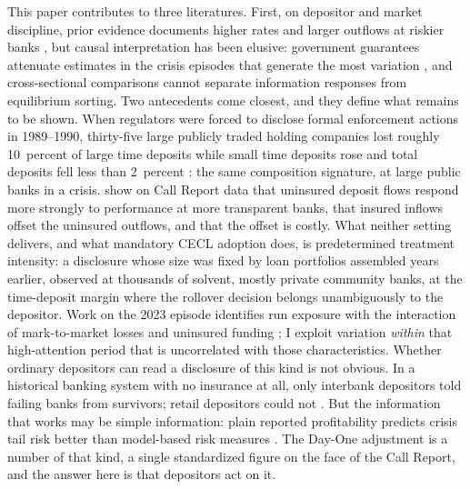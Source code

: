 This paper contributes to three literatures.  First, on depositor and
market discipline, prior evidence documents higher rates and larger
outflows at riskier banks \citep{park1995market, park1998market,
egan2017deposit},
but causal interpretation has
been elusive: government guarantees attenuate estimates in the crisis
episodes that generate the most variation \citep{berger2015depositors,
jacewitz2018deposit}, and cross-sectional
comparisons cannot separate information responses from equilibrium
sorting.  Two antecedents come closest, and they define what remains
to be shown.  When regulators were forced to disclose formal
enforcement actions in 1989--1990, thirty-five large publicly traded
holding companies lost roughly 10~percent of large time deposits while
small time deposits rose and total deposits fell less than 2~percent
\citep{jordan2000market}: the same composition signature, at large
public banks in a crisis.  \citet{chen2022bank} show on Call Report
data that uninsured deposit flows respond more strongly to performance
at more transparent banks, that insured inflows offset the uninsured
outflows, and that the offset is costly.  What neither setting
delivers, and what mandatory CECL adoption does, is predetermined
treatment intensity: a disclosure whose size was fixed by loan
portfolios assembled years earlier, observed at thousands of solvent,
mostly private community banks, at the time-deposit margin where the
rollover decision belongs unambiguously to the depositor.  Work on
the 2023 episode identifies run exposure with the interaction of
mark-to-market losses and uninsured funding \citep{jiang2024monetary};
I exploit variation \emph{within} that high-attention period that is
uncorrelated with those characteristics.  Whether ordinary depositors
can read a disclosure of this kind is not obvious.  In a historical
banking system with no insurance at all, only interbank depositors
told failing banks from survivors; retail depositors could not
\citep{blickle2024who}.  But the information that works may be simple
information: plain reported profitability predicts crisis tail risk
better than model-based risk measures \citep{meiselman2023judging}.
The Day-One adjustment is a number of that kind, a single standardized
figure on the face of the Call Report, and the answer here is that
depositors act on it.

